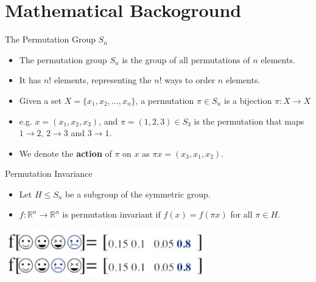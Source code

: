 \documentclass{beamer}
\begin{document}

\section{Mathematical Backoground}




\begin{frame}{The Permutation Group $S_n$}

    \begin{itemize}
        \setlength{\itemsep}{\fill}
        \item The permutation group $S_n$ is the group of all permutations of $n$ elements.
        \item It has $n!$ elements, representing the $n!$ ways to order $n$ elements.
        \item Given a set $X = \{x_1, x_2, \ldots, x_n\}$, a permutation $\pi \in S_n$ is a bijection $\pi: X \rightarrow X$
        \item e.g. $x = (x_1, x_2, x_3)$, and $\pi = (1, 2, 3) \in S_3$ is the permutation that maps $1 \rightarrow 2$, $2 \rightarrow 3$ and $3 \rightarrow 1$.
        \item We denote the \textbf{action} of $\pi$ on $x$ as $\pi x = (x_3, x_1, x_2)$. 
    \end{itemize}
    
\end{frame}



\begin{frame}{Permutation Invariance}

    \begin{itemize}
        \setlength{\itemsep}{\fill}
        \item Let $H \leq S_n$ be a subgroup of the symmetric group.
        \pause
        \item $f:\mathbb{R}^n \rightarrow \mathbb{R}^n$ is permutation invariant if $f(x) = f(\pi x)$ for all $\pi \in H$.
    \end{itemize}
    \begin{center}
        \pause
        \includegraphics[width=0.65\textwidth]{../figures/perm_in.png}
    \end{center}
    
\end{frame}
\end{document}
